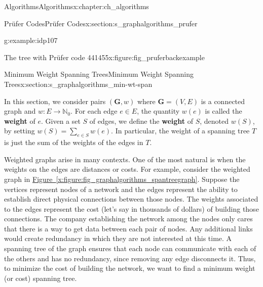 \documentclass[oneside,10pt,]{book}
\newcommand{\xreffont}{\relax}
\newcommand{\terminology}[1]{\textbf{#1}}
\numberwithin{equation}{section}
\newcommand{\nonnegints}{\mathbb{N}_0}
\newcommand{\GVE}{\mathbf{G}=(V,E)}
\newcommand{\bfG}{\mathbf{G}}
\begin{document}
\begin{chapterptx}{Algorithms}{}{Algorithms}{}{}{x:chapter:ch_algorithms}
\begin{sectionptx}{Prüfer Codes}{}{Prüfer Codes}{}{}{x:section:s_graphalgorithms_prufer}
\begin{example}{}{g:example:idp107}
\begin{figureptx}{The tree with Prüfer code 441455}{x:figure:fig_pruferbackexample}{}
\begin{image}{0.15}{0.7}{0.15}
%
\end{image}%
\tcblower
\end{figureptx}%
\end{example}
\end{sectionptx}
%
%
\typeout{************************************************}
\typeout{************************************************}
%
\begin{sectionptx}{Minimum Weight Spanning Trees}{}{Minimum Weight Spanning Trees}{}{}{x:section:s_graphalgorithms_min-wt-span}
\begin{introduction}{}%
In this section, we consider pairs \((\bfG,w)\) where \(\GVE\) is a connected graph and \(w\colon E\rightarrow\nonnegints\). For each edge \(e\in E\), the quantity \(w(e)\) is called the \terminology{weight} of \(e\). Given a set \(S\) of edges, we define the \terminology{weight} of \(S\), denoted \(w(S)\), by setting \(w(S)=\sum_{e\in S} w(e)\). In particular, the weight of a spanning tree \(T\) is just the sum of the weights of the edges in \(T\).%
\par
Weighted graphs arise in many contexts. One of the most natural is when the weights on the edges are distances or costs. For example, consider the weighted graph in \hyperref[x:figure:fig_graphalgorithms_spantreegraph]{Figure~{\xreffont\ref{x:figure:fig_graphalgorithms_spantreegraph}}}. Suppose the vertices represent nodes of a network and the edges represent the ability to establish direct physical connections between those nodes. The weights associated to the edges represent the cost (let's say in thousands of dollars) of building those connections. The company establishing the network among the nodes only cares that there is a way to get data between each pair of nodes. Any additional links would create redundancy in which they are not interested at this time. A spanning tree of the graph ensures that each node can communicate with each of the others and has no redundancy, since removing any edge disconnects it. Thus, to minimize the cost of building the network, we want to find a minimum weight (or cost) spanning tree.%

\end{introduction}
\end{sectionptx}
\end{chapterptx}
\end{document}
